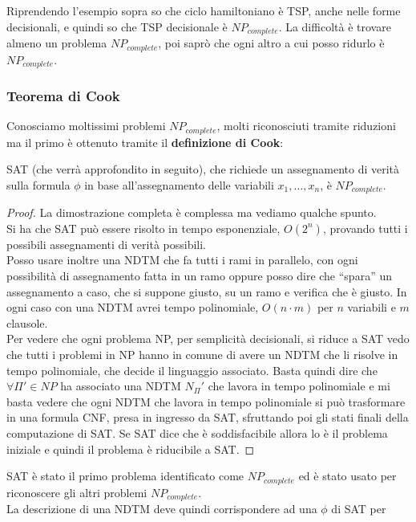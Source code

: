Riprendendo l'esempio sopra so
che ciclo hamiltoniano è TSP, anche nelle forme decisionali, e quindi so che TSP
decisionale è $NP_{complete}$. La difficoltà è trovare almeno un problema
$NP_{complete}$, poi saprò che ogni altro a cui posso ridurlo è $NP_{complete}$.\\
\subsubsection{Teorema di Cook}
Conosciamo moltissimi problemi $NP_{complete}$, molti riconosciuti tramite riduzioni
ma il primo è ottenuto tramite il \textbf{definizione di Cook}:
\begin{definizione}
  SAT (che verrà approfondito in seguito), che richiede un assegnamento di verità sulla
  formula $\phi$ in base all'assegnamento delle variabili $x_1,\ldots,x_n$, è
  $NP_{complete}$. 
\end{definizione}
\begin{proof}
  La dimostrazione completa è complessa ma vediamo qualche spunto.\\
  Si ha che SAT può essere risolto in tempo esponenziale, $O(2^n)$, provando
  tutti i possibili assegnamenti di verità possibili.\\
  Posso usare inoltre una NDTM che fa tutti i rami in parallelo, con ogni
  possibilità di assegnamento fatta in un ramo oppure posso dire che ``spara''
  un assegnamento a caso, che si suppone giusto, su un ramo e verifica che è
  giusto. In ogni caso con una NDTM avrei tempo polinomiale, $O(n\cdot m)$ per
  $n$ variabili e $m$ clausole.\\
  Per vedere che ogni problema NP, per semplicità decisionali, si riduce a SAT
  vedo che tutti i problemi in NP hanno in comune di avere un NDTM che li
  risolve in tempo polinomiale, che decide il linguaggio associato. Basta quindi
  dire che $\forall\Pi'\in NP$ ha associato una NDTM $N_\Pi'$ che lavora in
  tempo polinomiale e mi basta vedere che ogni NDTM che lavora in tempo
  polinomiale si può trasformare in una formula CNF, presa in ingresso da SAT,
  sfruttando poi gli stati finali della computazione di SAT. Se SAT dice che è
  soddisfacibile allora lo è il problema iniziale e quindi il problema è
  riducibile a SAT.
\end{proof}
SAT è stato il primo problema identificato come $NP_{complete}$ ed è stato usato per
riconoscere gli altri problemi $NP_{complete}$.\\
La descrizione di una NDTM deve quindi corrispondere ad una $\phi$ di SAT per
